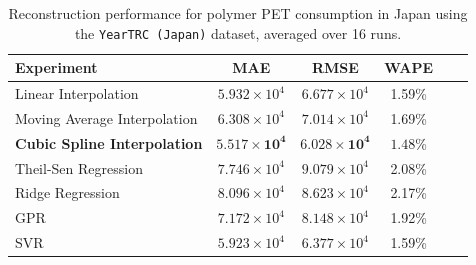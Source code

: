 \begin{table}[!ht]
	\centering
	\caption{\centering Reconstruction performance for polymer PET consumption in Japan using the \texttt{YearTRC (Japan)} dataset, averaged over 16 runs.}
	\begin{tabular}{@{}lccccc@{}}
		\toprule
		\textbf{Experiment}          & \textbf{MAE}                   & \textbf{RMSE}                  & \textbf{WAPE}       \\
		\midrule
		Linear Interpolation         & \(5.932 \times 10^4\)          & \(6.677 \times 10^4\)          & 1.59\%              \\
		Moving Average Interpolation & \(6.308 \times 10^4\)          & \(7.014 \times 10^4\)          & 1.69\%              \\
		\textbf{Cubic Spline Interpolation} & \(\mathbf{5.517 \times 10^4}\) & \(\mathbf{6.028 \times 10^4}\) & \(\mathbf{1.48}\)\% \\
		Theil-Sen Regression         & \(7.746 \times 10^4\)          & \(9.079 \times 10^4\)          & 2.08\%              \\
		Ridge Regression             & \(8.096 \times 10^4\)          & \(8.623 \times 10^4\)          & 2.17\%              \\
		GPR                          & \(7.172 \times 10^4\)          & \(8.148 \times 10^4\)          & 1.92\%              \\
		SVR                          & \(5.923 \times 10^4\)          & \(6.377 \times 10^4\)          & 1.59\%              \\
		\hline
	\end{tabular}
	\label{tab:reconstruction_japan_trc}
\end{table}
